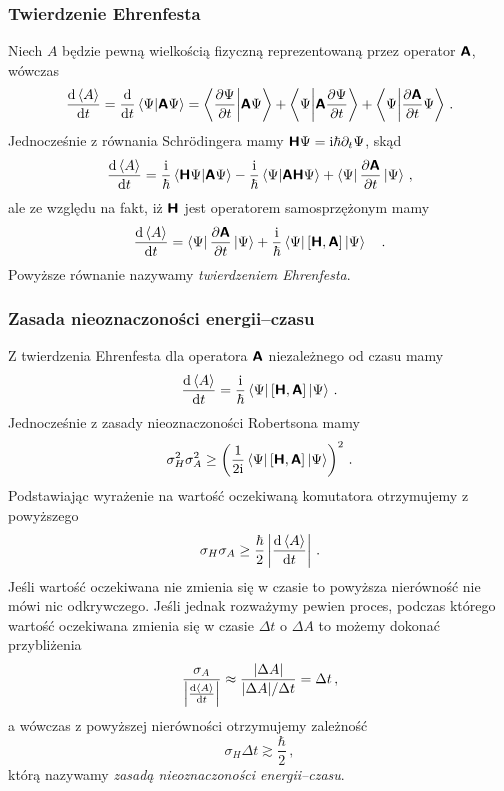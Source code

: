 \documentclass{myclass}
\begin{document}
\subsubsection*{Twierdzenie Ehrenfesta}

Niech \(A\) będzie pewną wielkością fizyczną reprezentowaną przez operator \(\boldsymbol{\mathsf{A}}\), wówczas
\begin{equation*}
        \dv{\expectationvalue{A}}{t} = \dv{}{t} \braket{\Psi}{\oper{A}\Psi}
        = \braket{\pdv{\Psi}{t}}{\oper{A}\Psi} + \braket{\Psi}{\oper{A}\pdv{\Psi}{t}} + \braket{\Psi}{\pdv{\oper{A}}{t}\Psi}\,.
\end{equation*}
Jednocześnie z równania Schr\"{o}dingera mamy \(\boldsymbol{\mathsf{H}}\Psi=\mathrm{i}\hbar{\partial_t\Psi}\), skąd
\begin{equation*}
    \dv{\expectationvalue{A}}{t} = \frac{\im}{\hbar}\braket{\oper{H}\Psi}{\oper{A}\Psi} - \frac{\im}{\hbar}\braket{\Psi}{\oper{A}\oper{H}\Psi} + \bra{\Psi}\pdv{\oper{A}}{t}\ket{\Psi}\,,
\end{equation*}
ale ze względu na fakt, iż \(\boldsymbol{\mathsf{H}}\) jest operatorem samosprzężonym mamy
\begin{equation*}
    \dv{\expectationvalue{A}}{t} = \bra{\Psi}\pdv{\oper{A}}{t}\ket{\Psi} + \frac{\im}{\hbar}\bra{\Psi}[\oper{H},\oper{A}]\ket{\Psi}
    \quad.
\end{equation*}
Powyższe równanie nazywamy \textit{twierdzeniem Ehrenfesta}.

\subsubsection*{Zasada nieoznaczoności energii--czasu}

Z twierdzenia Ehrenfesta dla operatora \(\boldsymbol{\mathsf{A}}\) niezależnego od czasu mamy
\begin{equation*}
    \dv{\expval{A}}{t} = \frac{\mathrm{i}}{\hbar}\bra{\Psi}[\boldsymbol{\mathsf{H}}, \boldsymbol{\mathsf{A}}]\ket{\Psi}\,.
\end{equation*}
Jednocześnie z zasady nieoznaczoności Robertsona mamy
\begin{equation*}
    \sigma_H^2\sigma_A^2 \geq \left(\frac{1}{2\mathrm{i}}\bra{\Psi}[\boldsymbol{\mathsf{H}}, \boldsymbol{\mathsf{A}}]\ket{\Psi}\right)^2\,.
\end{equation*}
Podstawiając wyrażenie na wartość oczekiwaną komutatora otrzymujemy z powyższego
\begin{equation*}
    \sigma_H\sigma_A \geq \frac{\hbar}{2} \left|\dv{\expval{A}}{t}\right|\,.
\end{equation*}
Jeśli wartość oczekiwana nie zmienia się w czasie to powyższa nierówność nie mówi nic odkrywczego.
Jeśli jednak rozważymy pewien proces, podczas którego wartość oczekiwana zmienia się w czasie
\(\Delta t\) o \(\Delta A\) to możemy dokonać przybliżenia 
\begin{equation*}
    \frac{\sigma_A}{\left|\dv{\expval{A}}{t}\right|} \approx \frac{|\Delta A|}{|\Delta A| / \Delta t} = \Delta t\,,
\end{equation*}
a wówczas z powyższej nierówności otrzymujemy zależność
\begin{equation*}
    \sigma_H\Delta t \gtrsim \frac{\hbar}{2}\,,
\end{equation*}
którą nazywamy \textit{zasadą nieoznaczoności energii--czasu}.
\end{document}
